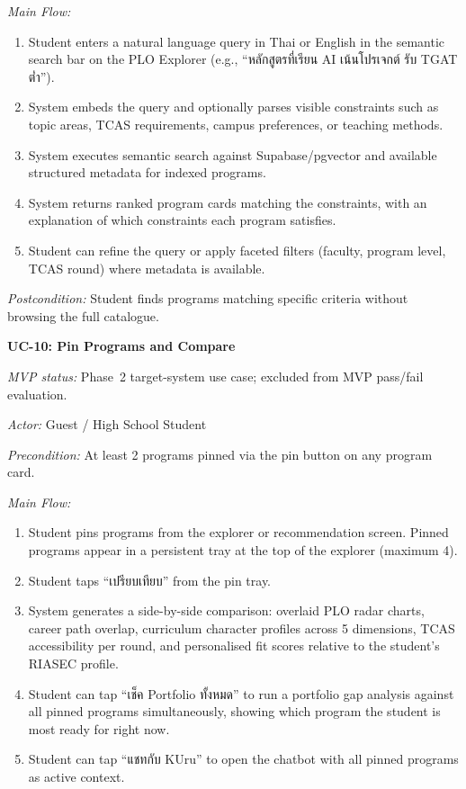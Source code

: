 \noindent\textit{Main Flow:}
\begin{enumerate}[leftmargin=80pt]
    \item Student enters a natural language query in Thai or English in the semantic search bar on the PLO Explorer (e.g., ``หลักสูตรที่เรียน AI เน้นโปรเจกต์ รับ TGAT ต่ำ'').
    \item System embeds the query and optionally parses visible constraints such as topic areas, TCAS requirements, campus preferences, or teaching methods.
    \item System executes semantic search against Supabase/pgvector and available structured metadata for indexed programs.
    \item System returns ranked program cards matching the constraints, with an explanation of which constraints each program satisfies.
    \item Student can refine the query or apply faceted filters (faculty, program level, TCAS round) where metadata is available.
\end{enumerate}

\noindent\textit{Postcondition:} Student finds programs matching specific criteria without browsing the full catalogue.

\vspace{1ex}
\noindent\textbf{UC-10: Pin Programs and Compare}

\noindent\textit{MVP status:} Phase~2 target-system use case; excluded from MVP pass/fail evaluation.

\noindent\textit{Actor:} Guest / High School Student

\noindent\textit{Precondition:} At least 2 programs pinned via the pin button on any program card.

\noindent\textit{Main Flow:}
\begin{enumerate}[leftmargin=80pt]
    \item Student pins programs from the explorer or recommendation screen. Pinned programs appear in a persistent tray at the top of the explorer (maximum 4).
    \item Student taps ``เปรียบเทียบ'' from the pin tray.
    \item System generates a side-by-side comparison: overlaid PLO radar charts, career path overlap, curriculum character profiles across 5 dimensions, TCAS accessibility per round, and personalised fit scores relative to the student's RIASEC profile.
    \item Student can tap ``เช็ค Portfolio ทั้งหมด'' to run a portfolio gap analysis against all pinned programs simultaneously, showing which program the student is most ready for right now.
    \item Student can tap ``แชทกับ KUru'' to open the chatbot with all pinned programs as active context.
\end{enumerate}

